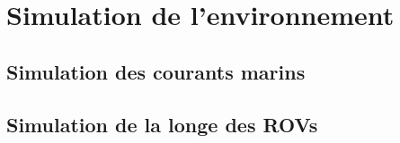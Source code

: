 \chapter{Simulation de l'environnement}

  \section{Simulation des courants marins}

  \section{Simulation de la longe des ROVs}
